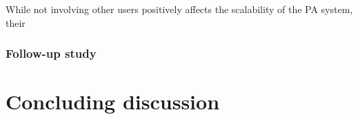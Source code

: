\documentclass[informationsecurity]{gucmasterproject}
\begin{document}
While not involving other users positively affects the scalability of the PA system, their 

\subsection{Follow-up study}











\chapter{Concluding discussion}




%

\end{document}
